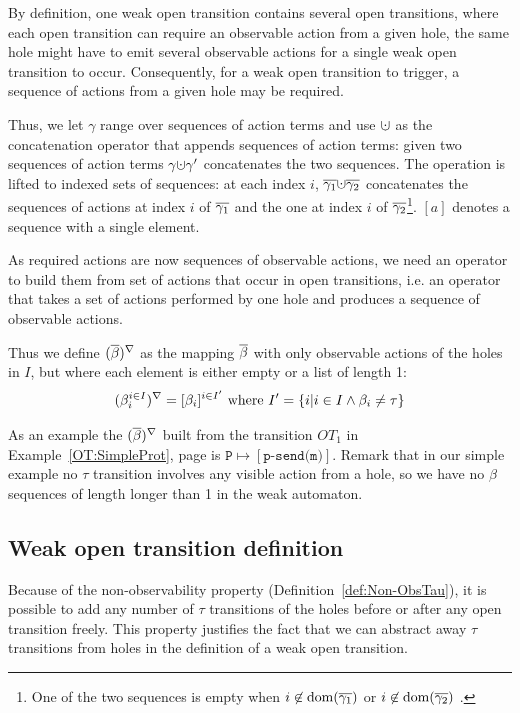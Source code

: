 \documentclass{lmcs}
\newcommand{\TODO}[1]{\textcolor{red}{\textbf{[TODO:#1]}}}
\begin{document}
By definition, one weak open transition contains  several open transitions, where  each open transition can require an observable action from a given hole, the same hole might have to emit several observable actions for a single weak open transition to occur. 
Consequently, for a weak open transition to trigger, a sequence of actions from a given hole may be required.

Thus, we let $\gamma$ range over sequences of action terms and use $\dotcup$ as the concatenation operator that appends sequences of action terms: given two sequences of action terms  $\gamma\dotcup\gamma '$ concatenates the two sequences. The operation is lifted to indexed sets of sequences:   at each index $i$, $\set {\gamma_1}\dotcup \set {\gamma_2}$ concatenates the sequences of actions at index $i$ of $\overline{\gamma_1}$ and the one at index $i$ of $\overline{\gamma_2}$\footnote{One of the two sequences is empty when $i\not \in \operatorname{dom}(\overline{\gamma_1})$ or $i\not \in \operatorname{dom}(\overline{\gamma_2})$ .}. $[a]$ denotes a sequence with a single element.

As required actions are now sequences of observable actions, we need an operator to build them from set of actions that occur in open transitions, i.e. an operator that takes a set of actions performed by one hole and produces a sequence of observable actions.

Thus we define $(\overline{\beta})^{\nabla}$ as the mapping $\overline{\beta}$  with only observable actions of the holes in $I$, but where each element is either empty or a list of length 1:
 \[(\beta_i^{i\in I})^{\nabla} = [\beta_i]^{i\in I'}\text{ where }I'=\left\{i| i\in I \land \beta_i\neq \tau\right\}\]

As an example the $(\overline{\beta})^{\nabla}$ built from the transition $OT_1$ in Example~\ref{OT:SimpleProt}, page \pageref{OT:SimpleProt} is $\texttt{P}\mapsto [\texttt{p-send(m)}]$. Remark that in our simple example no $\tau$ transition involves any visible action from a hole, so we have no $\beta$ sequences of length longer than 1 in the weak automaton.

\subsection{Weak open transition definition}

Because of the non-observability property (Definition~\ref{def:Non-ObsTau}), it is possible to add any number of $\tau$ transitions of the holes before or after any open transition freely. This property justifies the fact that we can abstract away $\tau$ transitions from holes in the definition of a weak open transition.
\end{document}
